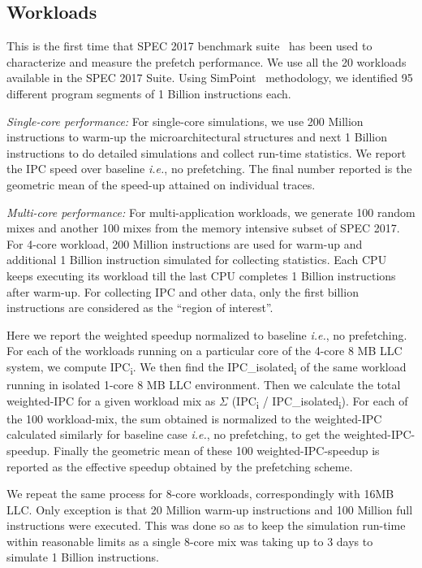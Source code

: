 \subsection{Workloads}
\label{Method-Workloads}
This is the first time that SPEC 2017 benchmark suite~\cite{SPEC2017}
has been used to characterize and measure the prefetch performance.
We use all the 20 workloads available in the SPEC 2017 Suite.  Using
SimPoint~\cite{SimPoint} methodology, we identified 95 different
program segments of 1 Billion instructions each.

\textit{Single-core performance:} For single-core simulations, we use
200 Million instructions to warm-up the microarchitectural structures
and next 1 Billion instructions to do detailed simulations and collect
run-time statistics. We report the IPC speed over
baseline \textit{i.e.}, no prefetching.
The final number reported is the geometric mean of the speed-up
attained on individual traces.

\textit{Multi-core performance:} For multi-application workloads, we
generate 100 random mixes and another 100 mixes from the
memory intensive subset of SPEC 2017.  For 4-core workload, 200
Million instructions are used for warm-up and additional 1 Billion
instruction simulated for collecting statistics.  Each CPU keeps
executing its workload till the last CPU completes 1 Billion
instructions after warm-up.  For collecting IPC and other data, only
the first billion instructions are considered as the ``region of
interest''.

Here we report the weighted speedup normalized to baseline
\textit{i.e.}, no prefetching.  For each of the workloads running on a
particular core of the 4-core 8 MB LLC system, we compute
IPC\textsubscript{i}.  We then find the IPC\_isolated\textsubscript{i}
of the same workload running in isolated 1-core 8 MB LLC environment.
Then we calculate the total weighted-IPC for a given workload mix as
$\Sigma$ (IPC\textsubscript{i} / IPC\_isolated\textsubscript{i}).  For
each of the 100 workload-mix, the sum obtained is normalized to the
weighted-IPC calculated similarly for baseline case \textit{i.e.}, no
prefetching, to get the weighted-IPC-speedup.  Finally the geometric
mean of these 100 weighted-IPC-speedup is reported as the effective
speedup obtained by the prefetching scheme.

We repeat the same process for 8-core workloads, correspondingly with 16MB LLC.
Only exception is that 20 Million warm-up instructions and 100 Million 
full instructions were executed.  
This was done so as to keep the simulation run-time
within reasonable limits as a single 8-core mix was taking up to 3
days to simulate 1 Billion instructions.

